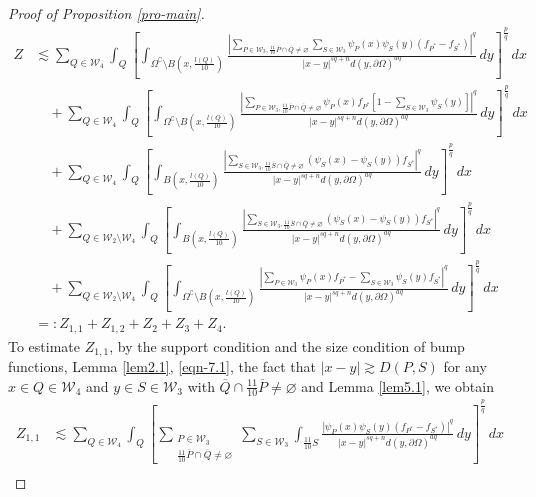 \documentclass[11pt,twoside]{article}
\def\cw{\mathcal W}
\def\sxing{S^{*}}
\def\pxing{P^{*}}
\def\boz{{\Omega}}
\def\pa{\partial}                %
\theoremstyle{mylem}
\theoremstyle{definition}
\numberwithin{equation}{section}
\begin{document}
\begin{proof}[Proof of Proposition \ref{pro-main}]
\begin{align}\label{eqn-6.19}
Z&\lesssim \sum_{Q\in\cw_4} \int_{Q} \left[ \int_{\boz^\complement\setminus B(x,\frac{l(Q)}{10})} \frac{|\sum_{P\in\mathcal{W}_3,\frac{11}{10}\overline{P}\cap\overline{Q} \neq\varnothing} \sum_{S\in\mathcal{W}_3} \psi_P(x) \psi_S(y)(f_{\pxing}-f_{\sxing})|^q
}{|x - y|^{s q + n}d(y,\pa\boz)^{aq}}\,dy \right]^{\frac{p}{q}}\,dx \nonumber\\
&\quad+\sum_{Q\in\cw_4} \int_{Q} \left[ \int_{\boz^\complement\setminus B(x,\frac{l(Q)}{10})} \frac{|\sum_{P\in\mathcal{W}_3, \frac{11}{10}\overline{P}\cap\overline{Q} \neq\varnothing}  \psi_P(x) f_{\pxing} [1-\sum_{S\in\mathcal{W}_3} \psi_S(y)]|^q}{|x - y|^{s q + n}d(y,\pa\boz)^{aq}}\,dy \right]^{\frac{p}{q}}\,dx \nonumber\\
&\quad+ \sum_{Q\in\cw_4} \int_{Q} \left[ \int_{ B(x,\frac{l(Q)}{10})} \frac{| \sum_{S\in\mathcal{W}_3, \frac{11}{10}\overline{S}\cap\overline{Q} \neq\varnothing} (\psi_S(x)-\psi_S(y))f_{S^{*}}|^q}{|x - y|^{s q + n}d(y,\pa\boz)^{aq}}\,dy \right]^{\frac{p}{q}}\,dx \nonumber\\
&\quad+ \sum_{Q\in\cw_2\setminus\cw_4} \int_{Q} \left[ \int_{B(x,\frac{l(Q)}{10})} \frac{|\sum_{S\in\mathcal{W}_3, \frac{11}{10}\overline{S}\cap\overline{Q} \neq\varnothing} (\psi_S(x)-\psi_S(y))f_{S^{*}}|^q}{|x - y|^{s q + n}d(y,\pa\boz)^{aq}}\,dy \right]^{\frac{p}{q}}\,dx \nonumber\\
&\quad+ \sum_{Q\in\cw_2\setminus\cw_4} \int_{Q} \left[ \int_{\boz^\complement\setminus B(x,\frac{l(Q)}{10})} \frac{| \sum_{P\in\mathcal{W}_3} \psi_P(x) f_{P^{*}} - \sum_{S\in\mathcal{W}_3} \psi_S(y) f_{S^{*}}|^q}{|x - y|^{s q + n}d(y,\pa\boz)^{aq}}\,dy \right]^{\frac{p}{q}}\,dx \nonumber\\
&=:Z_{1,1}+Z_{1,2}+Z_2+Z_3+Z_4.
\end{align}
To estimate $Z_{1,1}$, by the support condition and the size condition of bump functions,
Lemma \ref{lem2.1}, \eqref{eqn-7.1}, the fact that $|x-y|\gtrsim D(P,S)$ for any $x\in Q\in \mathcal{W}_4$ and $y\in S\in\mathcal{W}_3$ with $\overline{Q}\cap\frac{11}{10}\overline{P}\neq\varnothing$ and Lemma \ref{lem5.1}, we obtain
\begin{align*}
Z_{1,1}&\lesssim \sum_{Q\in\cw_4} \int_{Q} \left[ \sum_{\substack{P\in\mathcal{W}_3\\ \frac{11}{10}\overline{P}\cap\overline{Q} \neq\varnothing}} \sum_{S\in\mathcal{W}_3}\int_{\frac{11}{10}S}\frac{| \psi_P(x) \psi_S(y)(f_{\pxing}-f_{\sxing})|^q
}{|x - y|^{s q + n}d(y,\pa\boz)^{aq}}\,dy \right]^{\frac{p}{q}}\,dx \\

\end{align*}
\end{proof}
\end{document}
